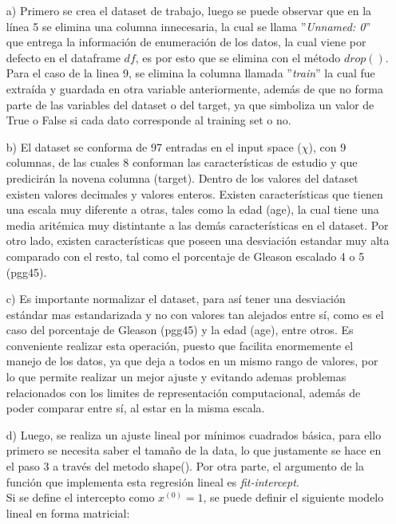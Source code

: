 \documentclass[10pt]{article}
\begin{document}
\begin{itemize}
\item[a)] Primero se crea el dataset de trabajo, luego se puede observar que en la línea 5 se elimina una columna innecesaria, la cual se llama ''\textit{Unnamed: 0}'' que entrega la información de enumeración de los datos, la cual viene por defecto en el dataframe $df$, es por esto que se elimina con el método $drop()$. Para el caso de la linea 9, se elimina la columna llamada ''\textit{train}'' la cual fue extraída y guardada en otra variable anteriormente, además de que no forma parte de las variables del dataset o del target, ya que simboliza un valor de True o False si cada dato corresponde al training set o no.

\item[b)] El dataset se conforma de 97 entradas en el input space ($\chi$), con 9 columnas, de las cuales 8 conforman las características de estudio y que predicirán la novena columna (target). Dentro de los valores del dataset existen valores decimales y valores enteros. Existen características que tienen una escala muy diferente a otras, tales como la edad (age), la cual tiene una media aritémica muy distintante a las demás características en el dataset. Por otro lado, existen características que poseen una desviación estandar muy alta comparado con el resto, tal como el porcentaje de Gleason escalado 4 o 5 (pgg45).

\item[c)] Es importante normalizar el dataset, para así tener una desviación estándar mas estandarizada y no con valores tan alejados entre sí, como es el caso del porcentaje de Gleason (pgg45) y la edad (age), entre otros. Es conveniente realizar esta operación, puesto que facilita enormemente el manejo de los datos, ya que deja a todos en un mismo rango de valores, por lo que permite realizar un mejor ajuste y evitando ademas problemas relacionados con los limites de representación computacional, además de poder comparar entre sí, al estar en la misma escala.


\item[d)] Luego, se realiza un ajuste lineal por mínimos cuadrados básica, para ello primero se necesita saber el tamaño de la data, lo que justamente se hace en el paso $3$ a través del metodo shape(). Por otra parte, el argumento de la función que implementa esta regresión lineal es \textit{fit-intercept}.\\

Si se define el intercepto como $x^{(0)} = 1$, se puede definir el siguiente modelo lineal en forma matricial:\\


\end{itemize}
\end{document}

